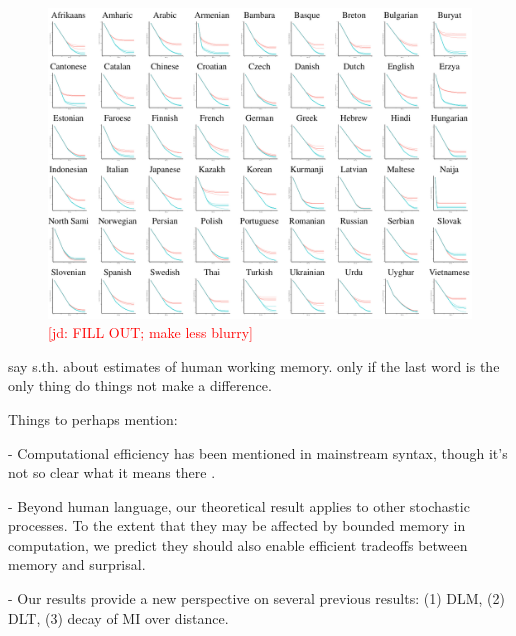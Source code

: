 \documentclass[12pt]{article}
\newcommand{\jd}[1]{\textcolor{Red}{[jd: #1]}}
\begin{document}
\begin{figure}
\includegraphics[width=\textwidth]{figures/full-results.png}
	\caption{\jd{FILL OUT; make less blurry}}\label{fig:results}
\end{figure}


say s.th. about estimates of human working memory. only if the last word is the only thing do things not make a difference.


Things to perhaps mention:


- Computational efficiency has been mentioned in mainstream syntax, though it's not so clear what it means there \cite{chomsky2005three,hauser2002faculty}.

- Beyond human language, our theoretical result applies to other stochastic processes. To the extent that they may be affected by bounded memory in computation, we predict they should also enable efficient tradeoffs between memory and surprisal.

- Our results provide a new perspective on several previous results: (1) DLM, (2) DLT, (3) decay of MI over distance.
\end{document}
